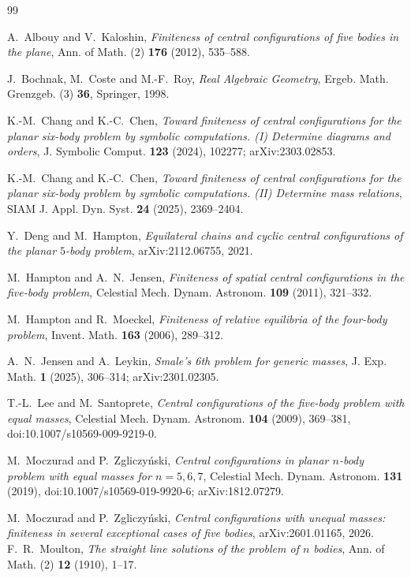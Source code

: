 \documentclass[11pt]{amsart}
\theoremstyle{definition}
\theoremstyle{remark}
\begin{document}
\begin{thebibliography}{99}

A.~Albouy and V.~Kaloshin, \emph{Finiteness of central configurations of five bodies in the
plane}, Ann. of Math. (2) \textbf{176} (2012), 535--588.

J.~Bochnak, M.~Coste and M.-F.~Roy, \emph{Real Algebraic Geometry}, Ergeb. Math. Grenzgeb. (3)
\textbf{36}, Springer, 1998.

K.-M.~Chang and K.-C.~Chen, \emph{Toward finiteness of central configurations for the planar
six-body problem by symbolic computations. (I) Determine diagrams and orders}, J. Symbolic
Comput. \textbf{123} (2024), 102277; arXiv:2303.02853.

K.-M.~Chang and K.-C.~Chen, \emph{Toward finiteness of central configurations for the planar
six-body problem by symbolic computations. (II) Determine mass relations}, SIAM J. Appl. Dyn.
Syst. \textbf{24} (2025), 2369--2404.

Y.~Deng and M.~Hampton, \emph{Equilateral chains and cyclic central configurations of the
planar $5$-body problem}, arXiv:2112.06755, 2021.

M.~Hampton and A.~N.~Jensen, \emph{Finiteness of spatial central configurations in the
five-body problem}, Celestial Mech. Dynam. Astronom. \textbf{109} (2011), 321--332.

M.~Hampton and R.~Moeckel, \emph{Finiteness of relative equilibria of the four-body problem},
Invent. Math. \textbf{163} (2006), 289--312.

A.~N.~Jensen and A.~Leykin, \emph{Smale's 6th problem for generic masses}, J. Exp. Math.
\textbf{1} (2025), 306--314; arXiv:2301.02305.

T.-L.~Lee and M.~Santoprete, \emph{Central configurations of the five-body problem with equal
masses}, Celestial Mech. Dynam. Astronom. \textbf{104} (2009), 369--381,
doi:10.1007/s10569-009-9219-0.

M.~Moczurad and P.~Zgliczy\'nski, \emph{Central configurations in planar $n$-body problem with
equal masses for $n=5,6,7$}, Celestial Mech. Dynam. Astronom. \textbf{131} (2019),
doi:10.1007/s10569-019-9920-6; arXiv:1812.07279.

M.~Moczurad and P.~Zgliczy\'nski, \emph{Central configurations with unequal masses: finiteness
in several exceptional cases of five bodies}, arXiv:2601.01165, 2026.
F.~R.~Moulton, \emph{The straight line solutions of the problem of $n$ bodies}, Ann. of Math. (2)
\textbf{12} (1910), 1--17.


\end{thebibliography}
\end{document}
